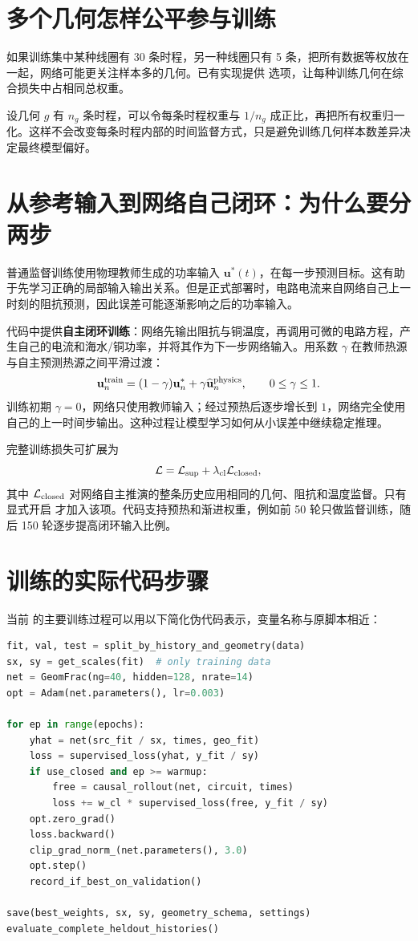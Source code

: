 \section{多个几何怎样公平参与训练}
如果训练集中某种线圈有 30 条时程，另一种线圈只有 5 条，把所有数据等权放在一起，网络可能更关注样本多的几何。已有实现提供  选项，让每种训练几何在综合损失中占相同总权重。

设几何 $g$ 有 $n_g$ 条时程，可以令每条时程权重与 $1/n_g$ 成正比，再把所有权重归一化。这样不会改变每条时程内部的时间监督方式，只是避免训练几何样本数差异决定最终模型偏好。

\section{从参考输入到网络自己闭环：为什么要分两步}
\label{sec:closedtrain}
普通监督训练使用物理教师生成的功率输入 $\mathbf u^*(t)$，在每一步预测目标。这有助于先学习正确的局部输入输出关系。但是正式部署时，电路电流来自网络自己上一时刻的阻抗预测，因此误差可能逐渐影响之后的功率输入。

代码中提供\textbf{自主闭环训练}：网络先输出阻抗与铜温度，再调用可微的电路方程，产生自己的电流和海水/铜功率，并将其作为下一步网络输入。用系数 $\gamma$ 在教师热源与自主预测热源之间平滑过渡：
\[
\mathbf u_n^{\rm train}
=(1-\gamma)\mathbf u_n^*
+\gamma\widehat{\mathbf u}_n^{\rm physics},
\qquad 0\le\gamma\le1.
\]
训练初期 $\gamma=0$，网络只使用教师输入；经过预热后逐步增长到 $1$，网络完全使用自己的上一时间步输出。这种过程让模型学习如何从小误差中继续稳定推理。

完整训练损失可扩展为
\[
\mathcal L=
\mathcal L_{\rm sup}
+\lambda_{\rm cl}\mathcal L_{\rm closed},
\]
其中 $\mathcal L_{\rm closed}$ 对网络自主推演的整条历史应用相同的几何、阻抗和温度监督。只有显式开启  才加入该项。代码支持预热和渐进权重，例如前 50 轮只做监督训练，随后 150 轮逐步提高闭环输入比例。

\section{训练的实际代码步骤}
当前  的主要训练过程可以用以下简化伪代码表示，变量名称与原脚本相近：
\begin{lstlisting}[language=Python,caption={几何条件分数阶网络训练流程示意}]
fit, val, test = split_by_history_and_geometry(data)
sx, sy = get_scales(fit)  # only training data
net = GeomFrac(ng=40, hidden=128, nrate=14)
opt = Adam(net.parameters(), lr=0.003)

for ep in range(epochs):
    yhat = net(src_fit / sx, times, geo_fit)
    loss = supervised_loss(yhat, y_fit / sy)
    if use_closed and ep >= warmup:
        free = causal_rollout(net, circuit, times)
        loss += w_cl * supervised_loss(free, y_fit / sy)
    opt.zero_grad()
    loss.backward()
    clip_grad_norm_(net.parameters(), 3.0)
    opt.step()
    record_if_best_on_validation()

save(best_weights, sx, sy, geometry_schema, settings)
evaluate_complete_heldout_histories()
\end{lstlisting}

